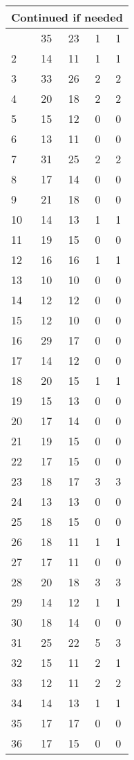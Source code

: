 \begin{center}
\begin{longtable}{l|c|c|c|c}
\hline \multicolumn{5}{|r|}{{Continued if needed}} \\ \hline
\endfoot 
1 & 35 & 23 & 1 & 1\\ \hline
2 & 14 & 11 & 1 & 1\\ \hline
3 & 33 & 26 & 2 & 2\\ \hline
4 & 20 & 18 & 2 & 2\\ \hline
5 & 15 & 12 & 0 & 0\\ \hline
6 & 13 & 11 & 0 & 0\\ \hline
7 & 31 & 25 & 2 & 2\\ \hline
8 & 17 & 14 & 0 & 0\\ \hline
9 & 21 & 18 & 0 & 0\\ \hline
10 & 14 & 13 & 1 & 1\\ \hline
11 & 19 & 15 & 0 & 0\\ \hline
12 & 16 & 16 & 1 & 1\\ \hline
13 & 10 & 10 & 0 & 0\\ \hline
14 & 12 & 12 & 0 & 0\\ \hline
15 & 12 & 10 & 0 & 0\\ \hline
16 & 29 & 17 & 0 & 0\\ \hline
17 & 14 & 12 & 0 & 0\\ \hline
18 & 20 & 15 & 1 & 1\\ \hline
19 & 15 & 13 & 0 & 0\\ \hline
20 & 17 & 14 & 0 & 0\\ \hline
21 & 19 & 15 & 0 & 0\\ \hline
22 & 17 & 15 & 0 & 0\\ \hline
23 & 18 & 17 & 3 & 3\\ \hline
24 & 13 & 13 & 0 & 0\\ \hline
25 & 18 & 15 & 0 & 0\\ \hline
26 & 18 & 11 & 1 & 1\\ \hline
27 & 17 & 11 & 0 & 0\\ \hline
28 & 20 & 18 & 3 & 3\\ \hline
29 & 14 & 12 & 1 & 1\\ \hline
30 & 18 & 14 & 0 & 0\\ \hline
31 & 25 & 22 & 5 & 3\\ \hline
32 & 15 & 11 & 2 & 1\\ \hline
33 & 12 & 11 & 2 & 2\\ \hline
34 & 14 & 13 & 1 & 1\\ \hline
35 & 17 & 17 & 0 & 0\\ \hline
36 & 17 & 15 & 0 & 0\\ \hline

\end{longtable}
\end{center}
